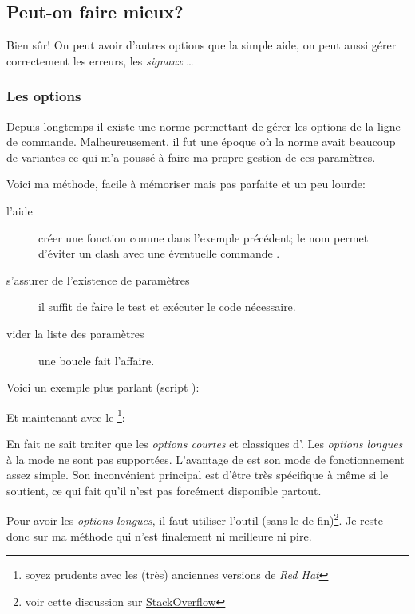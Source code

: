 \subsection{Peut-on faire mieux?}
Bien sûr! On peut avoir d'autres options que la simple aide, on peut aussi gérer correctement les erreurs, les \emph{signaux \unix}\ldots

\subsubsection{Les options}
Depuis longtemps il existe une norme \POSIX{} permettant de gérer les options de la ligne
de commande. Malheureusement, il fut une époque où la norme avait beaucoup de variantes
ce qui m'a poussé à faire ma propre gestion de ces paramètres.

Voici ma méthode, facile à mémoriser mais pas parfaite et un peu lourde:

\begin{description}
    \item[l'aide] créer une fonction  comme dans l'exemple précédent;
    le nom  per\-met d'éviter un clash avec une éventuelle commande .
    \item[s'assurer de l'existence de paramètres] il suffit de faire le test \code{[ \$\# -eq 0 ]} et
    exécuter le code nécessaire.
    \item[vider la liste des paramètres] une boucle  fait l'affaire.
\end{description}

Voici un exemple plus parlant (script ):


Et maintenant avec le \footnote{soyez prudents avec les (très) anciennes versions de \emph{Red Hat}}:


En fait  ne sait traiter que les \emph{options courtes} et classiques d'\unix. Les \emph{options longues}
à la mode \linux{} ne sont pas supportées. L'avantage de  est son mode de fonctionnement
assez simple. Son inconvénient principal est d'être très spécifique à \bash{} même si \POSIX{} le soutient, ce qui fait qu'il
n'est pas forcément disponible partout.

Pour avoir les \emph{options longues}, il faut utiliser l'outil \GNU{}  (sans le  de fin)\footnote{voir cette discussion sur \href{http://stackoverflow.com/questions/402377/using-getopts-in-bash-shell-script-to-get-long-and-short-command-line-options}{StackOverflow}}. 
Je reste donc sur ma méthode qui n'est finalement ni meilleure ni pire.

